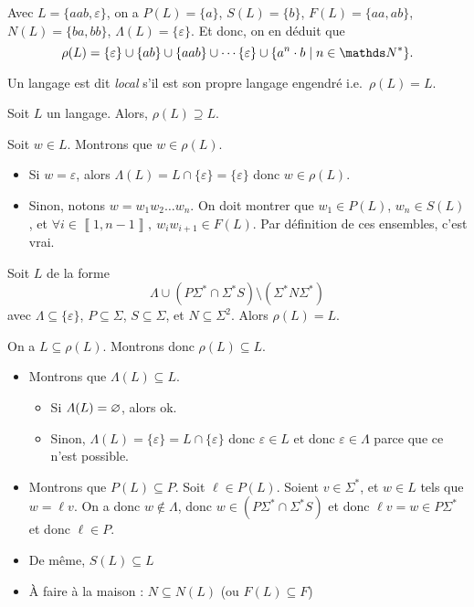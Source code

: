 \begin{exm}
	Avec $L = \{aab, \varepsilon\}$, on a $P(L) = \{a\}$, $S(L) = \{b\}$, $F(L) = \{aa,ab\}$, $N(L) = \{ba,bb\}$, $\Lambda(L) = \{\varepsilon\}$. Et donc, on en déduit que \[
		\rho(L) = \{\varepsilon\} \cup \{ab\} \cup \{aab\} \cup \cdots \{\varepsilon\} \cup \{a^n\cdot b  \mid n \in \N^*\}
	.\] 
\end{exm}

\begin{defn}
	Un langage est dit \textit{local} s'il est son propre langage engendré i.e.\ $\rho(L) = L$.
\end{defn}

\begin{prop}
	Soit $L$\/ un langage. Alors, $\rho(L) \supseteq L$.
\end{prop}

\begin{prv}
	Soit $w \in L$. Montrons que $w \in \rho(L)$.
	\begin{itemize}
		\item Si $w = \varepsilon$, alors $\Lambda(L) = L \cap \{\varepsilon\} = \{\varepsilon\}$\/ donc $w \in \rho(L)$.
		\item Sinon, notons $w = w_1w_2\ldots w_n$. On doit montrer que $w_1 \in P(L)$, $w_n \in S(L)$, et $\forall i \in \left\llbracket 1,n-1 \right\rrbracket,\:w_i w_{i+1} \in F(L)$. Par définition de ces ensembles, c'est vrai.
	\end{itemize}
\end{prv}

\begin{prop}
	Soit $L$\/ de la forme \[
		\Lambda \cup (P\Sigma^* \cap \Sigma^* S) \setminus (\Sigma^* N\Sigma^*)
	\] avec $\Lambda \subseteq \{\varepsilon\}$, $P \subseteq \Sigma$, $S \subseteq \Sigma$, et $N \subseteq \Sigma^2$.
	Alors $\rho(L) = L$.
\end{prop}

\begin{prv}
	On a $L \subseteq \rho(L)$. Montrons donc $\rho(L)\subseteq L$.

	\begin{itemize}
		\item Montrons que $\Lambda(L) \subseteq L$.
			\begin{itemize}
				\item Si $\varLambda(L) = \varnothing$, alors {\sc ok}.
				\item Sinon, $\Lambda (L) = \{\varepsilon\} = L \cap \{\varepsilon\}$\/ donc $\varepsilon \in L$\/ et donc $\varepsilon \in \Lambda$\/ parce que ce n'est possible.
			\end{itemize}
		\item Montrons que $P(L) \subseteq P$. Soit $\ell \in P(L)$. Soient $v \in \Sigma^*$, et $w \in L$\/ tels que $w = \ell v$. On a donc $w \not\in  \Lambda$, donc $w \in (P\Sigma^* \cap \Sigma^* S)$\/ et donc $\ell v = w \in P\Sigma^*$\/ et donc $\ell \in P$.
		\item De même, $S(L) \subseteq L$\/
		\item À faire à la maison : $N \subseteq N(L)$\/ (ou $F(L) \subseteq F$)
	\end{itemize}
\end{prv}

